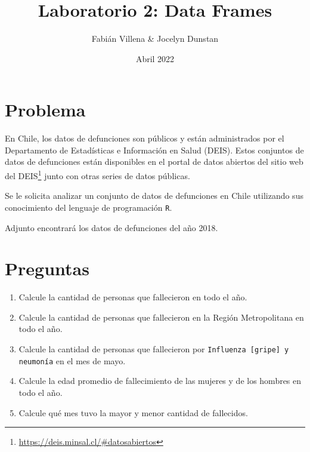 \documentclass{article}
\title{Laboratorio 2: Data Frames}
\author{Fabián Villena \& Jocelyn Dunstan}
\date{Abril 2022}
\begin{document}
\maketitle

\section{Problema}

En Chile, los datos de defunciones son públicos y están administrados por el Departamento de Estadísticas e Información en Salud (DEIS). Estos conjuntos de datos de defunciones están disponibles en el portal de datos abiertos del sitio web del DEIS\footnote{\url{https://deis.minsal.cl/\#datosabiertos}} junto con otras series de datos públicas.

Se le solicita analizar un conjunto de datos de defunciones en Chile utilizando sus conocimiento del lenguaje de programación \texttt{R}.

Adjunto encontrará los datos de defunciones del año 2018.

\section{Preguntas}

\begin{enumerate}
    \item Calcule la cantidad de personas que fallecieron en todo el año.
    \item Calcule la cantidad de personas que fallecieron en la Región Metropolitana en todo el año.
    \item Calcule la cantidad de personas que fallecieron por \texttt{Influenza [gripe] y neumonía} en el mes de mayo.
    \item Calcule la edad promedio de fallecimiento de las mujeres y de los hombres en todo el año.
    \item Calcule qué mes tuvo la mayor y menor cantidad de fallecidos.
\end{enumerate}
\end{document}
